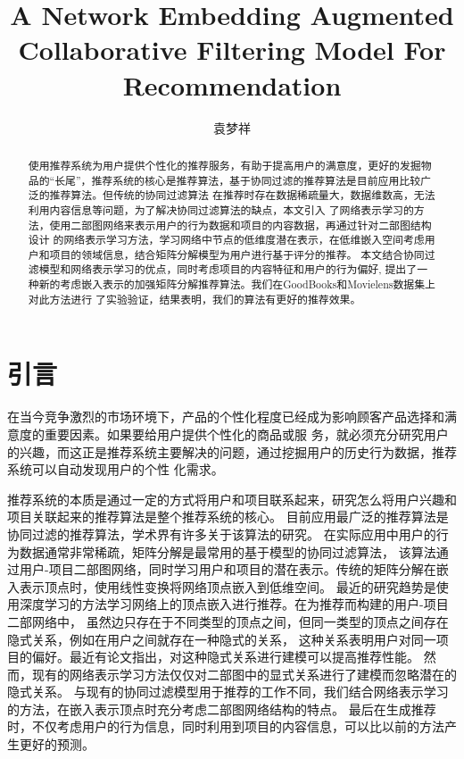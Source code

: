 \documentclass[lang=cn,11pt]{elegantpaper}
\title{A Network Embedding Augmented Collaborative Filtering Model For Recommendation}
\author{袁梦祥}
\institute{安徽大学大数据与云服务工程实验室}
\date{}
\begin{document}
\maketitle

\begin{abstract}
\noindent 使用推荐系统为用户提供个性化的推荐服务，有助于提高用户的满意度，更好的发掘物品的“长尾”，推荐系统的核心是推荐算法，基于协同过滤的推荐算法是目前应用比较广泛的推荐算法。但传统的协同过滤算法
在推荐时存在数据稀疏量大，数据维数高，无法利用内容信息等问题，为了解决协同过滤算法的缺点，本文引入
了网络表示学习的方法，使用二部图网络来表示用户的行为数据和项目的内容数据，再通过针对二部图结构设计
的网络表示学习方法，学习网络中节点的低维度潜在表示，在低维嵌入空间考虑用户和项目的领域信息，结合矩阵分解模型为用户进行基于评分的推荐。
本文结合协同过滤模型和网络表示学习的优点，同时考虑项目的内容特征和用户的行为偏好,
提出了一种新的考虑嵌入表示的加强矩阵分解推荐算法。我们在GoodBooks和Movielens数据集上对此方法进行
了实验验证，结果表明，我们的算法有更好的推荐效果。
\end{abstract}


\section{引言}

在当今竞争激烈的市场环境下，产品的个性化程度已经成为影响顾客产品选择和满意度的重要因素。如果要给用户提供个性化的商品或服
务，就必须充分研究用户的兴趣，而这正是推荐系统主要解决的问题，通过挖掘用户的历史行为数据，推荐系统可以自动发现用户的个性
化需求。

推荐系统的本质是通过一定的方式将用户和项目联系起来，研究怎么将用户兴趣和项目关联起来的推荐算法是整个推荐系统的核心。
目前应用最广泛的推荐算法是协同过滤的推荐算法，学术界有许多关于该算法的研究\cite{Linden2003,Miranda2009,Sarwar2001a,Su2009}。
在实际应用中用户的行为数据通常非常稀疏，矩阵分解是最常用的基于模型的协同过滤算法\cite{Salakhutdinov2007,Koren2009}，
该算法通过用户-项目二部图网络，同时学习用户和项目的潜在表示。传统的矩阵分解在嵌入表示顶点时，使用线性变换将网络顶点嵌入到低维空间。
最近的研究趋势是使用深度学习的方法学习网络上的顶点嵌入\cite{He2017}进行推荐。在为推荐而构建的用户-项目二部网络中，
虽然边只存在于不同类型的顶点之间，但同一类型的顶点之间存在隐式关系，例如在用户之间就存在一种隐式的关系，
这种关系表明用户对同一项目的偏好。最近有论文指出，对这种隐式关系进行建模可以提高推荐性能\cite{Yu2018}。
然而，现有的网络表示学习方法\cite{Perozzi2014,Grover2016,Tang2015}仅仅对二部图中的显式关系进行了建模而忽略潜在的隐式关系。
与现有的协同过滤模型用于推荐的工作不同，我们结合网络表示学习的方法，在嵌入表示顶点时充分考虑二部图网络结构的特点。
最后在生成推荐时，不仅考虑用户的行为信息，同时利用到项目的内容信息，可以比以前的方法产生更好的预测。
\end{document}
